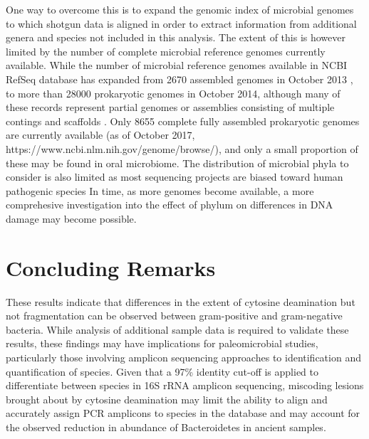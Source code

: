 \documentclass[12pt, a4paper]{article}
\begin{document}
{One way to overcome this is to expand the genomic index of microbial genomes to which shotgun data is aligned in order to extract information from additional genera and species not included in this analysis.
The extent of this is however limited by the number of complete microbial reference genomes currently available. 
While the number of microbial reference genomes available in NCBI RefSeq database has expanded from 2670 assembled genomes in October 2013 \cite{Tatusova:2015aa}, to more than 28000 prokaryotic genomes in October 2014, although many of these records represent partial genomes or assemblies consisting of multiple contings and scaffolds \cite{Tatusova:2015ab}.
Only 8655 complete fully assembled prokaryotic genomes are currently available (as of October 2017, https://www.ncbi.nlm.nih.gov/genome/browse/), and only a small proportion of these may be found in oral microbiome. 
The distribution of microbial phyla to consider is also limited as most sequencing projects are biased toward human pathogenic species \cite{Mukherjee:2017aa}
In time, as more genomes become available, a more comprehesive investigation into the effect of phylum on differences in DNA damage may become possible.
\clearpage


\section{Concluding Remarks}

These results indicate that differences in the extent of cytosine deamination but not fragmentation can be observed between gram-positive and gram-negative bacteria. 
While analysis of additional sample data is required to validate these results, these findings may have implications for paleomicrobial studies, particularly those involving amplicon sequencing approaches to identification and quantification of species. 
Given that a 97\% identity cut-off is applied to differentiate between species in 16S rRNA amplicon sequencing, miscoding lesions brought about by cytosine deamination may limit the ability to align and accurately assign PCR amplicons to species in the database and may account for the observed reduction in abundance of Bacteroidetes in ancient samples. 

}
\end{document}
